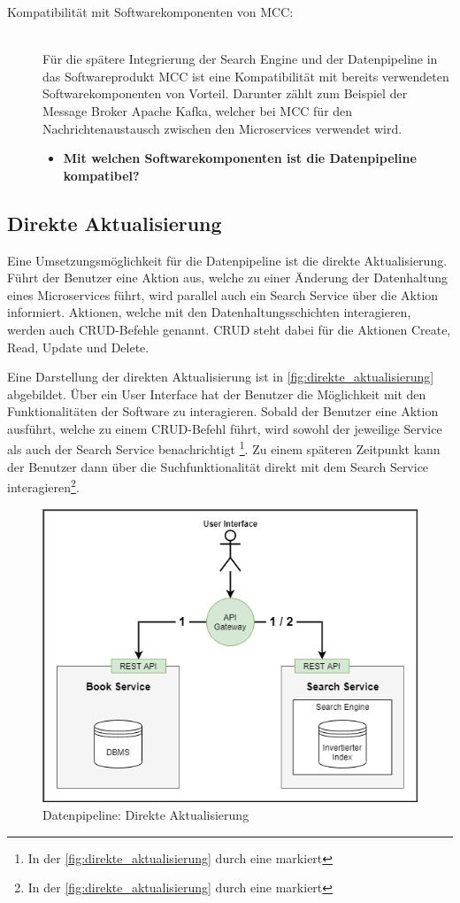 \begin{description}
    \item[Kompatibilität mit Softwarekomponenten von MCC:]\hfill \\
    Für die spätere Integrierung der Search Engine und der Datenpipeline in das Softwareprodukt MCC ist eine Kompatibilität mit bereits verwendeten Softwarekomponenten von Vorteil. Darunter zählt zum Beispiel der Message Broker \glqq Apache Kafka\grqq{}, welcher bei MCC für den Nachrichtenaustausch zwischen den Microservices verwendet wird.

    \begin{itemize}
        \item \textbf{Mit welchen Softwarekomponenten ist die Datenpipeline kompatibel?}
    \end{itemize}

\end{description}

\subsection{Direkte Aktualisierung\label{subsec4.3.2:Unterunterpunkt-2}}

Eine Umsetzungsmöglichkeit für die Datenpipeline ist die direkte Aktualisierung. Führt der Benutzer eine Aktion aus, welche zu einer Änderung der Datenhaltung eines Microservices führt, wird parallel auch ein Search Service über die Aktion informiert. Aktionen, welche mit den Datenhaltungsschichten interagieren, werden auch CRUD-Befehle genannt. CRUD steht dabei für die Aktionen \glqq Create\grqq{}, \glqq Read\grqq{}, \glqq Update\grqq{} und \glqq Delete\grqq{}.

Eine Darstellung der direkten Aktualisierung ist in \autoref{fig:direkte_aktualisierung} abgebildet. Über ein User Interface hat der Benutzer die Möglichkeit mit den Funktionalitäten der Software zu interagieren. Sobald der Benutzer eine Aktion ausführt, welche zu einem CRUD-Befehl führt, wird sowohl der jeweilige Service als auch der Search Service benachrichtigt \footnote{In der \autoref{fig:direkte_aktualisierung} durch eine \grqq{} markiert}. Zu einem späteren Zeitpunkt kann der Benutzer dann über die Suchfunktionalität direkt mit dem Search Service interagieren\footnote{In der \autoref{fig:direkte_aktualisierung} durch eine \grqq{} markiert}.

\begin{figure}[H]
    \centering
    \includegraphics[width=0.6\linewidth]{images/direkte_aktualisierung.png}
    \caption{Datenpipeline: Direkte Aktualisierung}
    \label{fig:direkte_aktualisierung}
\end{figure}

